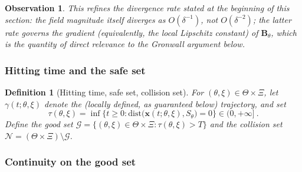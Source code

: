 \documentclass{article}
\newtheorem{defn}{Definition}
\newtheorem{obs}{Observation}
\begin{document}
	\begin{obs}
		This refines the divergence rate stated at the beginning of this section: the field magnitude itself diverges as $O(\delta^{-1})$, not $O(\delta^{-2})$; the latter rate governs the \emph{gradient} (equivalently, the local Lipschitz constant) of $\mathbf{B}_\theta$, which is the quantity of direct relevance to the Gronwall argument below.
	\end{obs}
	
	\subsubsection{Hitting time and the safe set}
	
	\begin{defn}[Hitting time, safe set, collision set] \label{def:hitting_time}
		For $(\theta, \xi) \in \Theta \times \Xi$, let $\gamma(t;\theta,\xi)$ denote the (locally defined, as guaranteed below) trajectory, and set
		\begin{equation}
			\tau(\theta,\xi) = \inf\{ t \ge 0 : \mathrm{dist}\big(\mathbf{x}(t;\theta,\xi), S_\theta\big) = 0\} \in (0, +\infty] \ .
		\end{equation}
		Define the \textit{good set} $\mathcal{G} = \{(\theta,\xi) \in \Theta \times \Xi : \tau(\theta,\xi) > T\}$ and the \textit{collision set} $\mathcal{N} = (\Theta \times \Xi) \setminus \mathcal{G}$.
	\end{defn}
	
	\subsubsection{Continuity on the good set}
	
\end{document}
